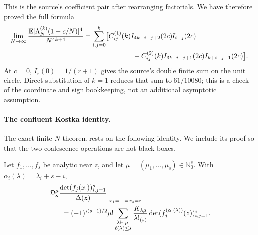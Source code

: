 This is the source's coefficient pair after rearranging factorials.  We have therefore proved
the full formula
\begin{align}
 \lim_{N\to\infty}\frac{\mathbb E|\Lambda_N^{(k)}(1-c/N)|^4}{N^{4k+4}}
 &=\sum_{i,j=0}^{k}\bigl[
 C^{(1)}_{ij}(k)I_{4k-i-j+2}(2c)I_{i+j}(2c)\notag\\
 &\hspace{25mm}
 -C^{(2)}_{ij}(k)I_{3k-i-j+1}(2c)I_{k+i+j+1}(2c)
 \bigr].
 \label{eq:GMS-audit-fourth-final}
\end{align}
At $c=0$, $I_r(0)=1/(r+1)$ gives the source's double finite sum on the unit circle.  Direct
substitution of $k=1$ reduces that sum to $61/10080$; this is a check of the coordinate and
sign bookkeeping, not an additional asymptotic assumption.

\paragraph{The confluent Kostka identity.}
The exact finite-$N$ theorem rests on the following identity.  We include its proof so that the
two coalescence operations are not black boxes.

\begin{lemma}
\label{lem:GMS-audit-confluent-Kostka}
Let $f_1,\ldots,f_s$ be analytic near $z$, and let
$\mu=(\mu_1,\ldots,\mu_s)\in\mathbb N_0^s$.  With
$\alpha_i(\lambda)=\lambda_i+s-i$,
\begin{align}
 &\left.
 \mathcal D_{\mathbf x}^{\mu}
 \frac{\det(f_j(x_i))_{i,j=1}^{s}}{\Delta(\mathbf x)}
 \right|_{x_1=\cdots=x_s=z}\notag\\
 &\qquad=(-1)^{s(s-1)/2}\mu!
 \sum_{\substack{\lambda\vdash|\mu|\\\ell(\lambda)\leq s}}
 \frac{K_{\lambda\mu}}{\lambda!_{(s)}}
 \det(f_j^{(\alpha_i(\lambda))}(z))_{i,j=1}^{s}.
 \label{eq:GMS-audit-confluent-Kostka}
\end{align}
\end{lemma}


